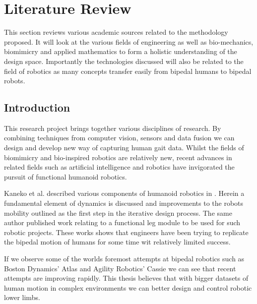 \chapter{Literature Review}
This section reviews various academic sources related to the methodology proposed. It will look at the various fields of engineering as well as bio-mechanics, biomimicry and applied mathematics to form a holistic understanding of the design space. Importantly the technologies discussed will also be related to the field of robotics as many concepts transfer easily from bipedal humans to bipedal robots.

\section{Introduction}
This research project brings together various disciplines of research. By combining techniques from computer vision, sensors and data fusion we can design and develop new way of capturing human gait data. Whilst the fields of biomimicry and bio-inspired robotics are relatively new, recent advances in related fields such as artificial intelligence and robotics have invigorated the pursuit of functional humanoid robotics. 

Kaneko et al. described various components of humanoid robotics in \cite{kaneko2002design}. Herein a fundamental element of dynamics is discussed and improvements to the robots mobility outlined as the first step in the iterative design process. The same author published work \cite{kaneko2002legs} relating to a functional leg module to be used for such robotic projects. These works shows that engineers have been trying to replicate the bipedal motion of humans for some time wit relatively limited success.

If we observe some of the worlds foremost attempts at bipedal robotics such as Boston Dynamics' Atlas \cite{bdyt} and Agility Robotics' Cassie \cite{aryt} we can see that recent attempts are improving rapidly. This thesis believes that with bigger datasets of human motion in complex environments we can better design and control robotic lower limbs. 

